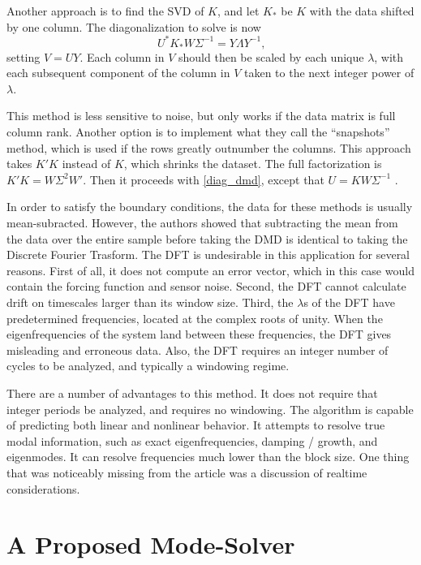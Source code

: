 \documentclass[a4paper,10pt]{report}
\numberwithin{equation}{section}
\begin{document}
Another approach is to find the SVD of $K$, and let $K_{*}$ be $K$ with the data shifted by one column. The diagonalization to solve is now
\begin{equation}\label{diag_dmd}
U^*K_{*}W\Sigma^{-1} = Y\Lambda Y^{-1}\text{,}
\end{equation}
setting $V = UY$. Each column in $V$ should then be scaled by each unique $\lambda$, with each subsequent component of the column in $V$ taken to the next integer power of $\lambda$. \cite{Chen2012}

This method is less sensitive to noise, but only works if the data matrix is full column rank. Another option is to implement what they call the ``snapshots'' method, which is used if the rows greatly outnumber the columns. This approach takes $K'K$ instead of $K$, which shrinks the dataset. The full factorization is $K'K = W\Sigma^2W'$. Then it proceeds with \eqref{diag_dmd}, except that $U = KW\Sigma^{-1}$ .\cite{Chen2012}

In order to satisfy the boundary conditions, the data for these methods is usually mean-subracted. However, the authors showed that subtracting the mean from the data over the entire sample before taking the DMD is identical to taking the Discrete Fourier Trasform. The DFT is undesirable in this application for several reasons. First of all, it does not compute an error vector, which in this case would contain the forcing function and sensor noise. Second, the DFT cannot calculate drift on timescales larger than its window size. Third, the $\lambda$s of the DFT have predetermined frequencies, located at the complex roots of unity. When the eigenfrequencies of the system land between these frequencies, the DFT gives misleading and erroneous data. Also, the DFT requires an integer number of cycles to be analyzed, and typically a windowing regime. \cite{Chen2012}

There are a number of advantages to this method. It does not require that integer periods be analyzed, and requires no windowing. The algorithm is capable of predicting both linear and nonlinear behavior. It attempts to resolve true modal information, such as exact eigenfrequencies, damping / growth, and eigenmodes. It can resolve frequencies much lower than the block size. One thing that was noticeably missing from the article was a discussion of realtime considerations. \cite{Chen2012}

\section{A Proposed Mode-Solver}\label{sec:modesolver}
\end{document}
